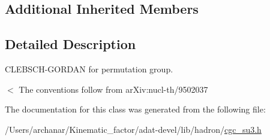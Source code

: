 \subsection*{Additional Inherited Members}


\subsection{Detailed Description}
C\+L\+E\+B\+S\+C\+H-\/\+G\+O\+R\+D\+AN for permutation group. 

$<$ The conventions follow from ar\+Xiv\+:nucl-\/th/9502037 

The documentation for this class was generated from the following file\+:\begin{DoxyCompactItemize}
\item 
/\+Users/archanar/\+Kinematic\+\_\+factor/adat-\/devel/lib/hadron/\mbox{\hyperlink{adat-devel_2lib_2hadron_2cgc__su3_8h}{cgc\+\_\+su3.\+h}}\end{DoxyCompactItemize}

